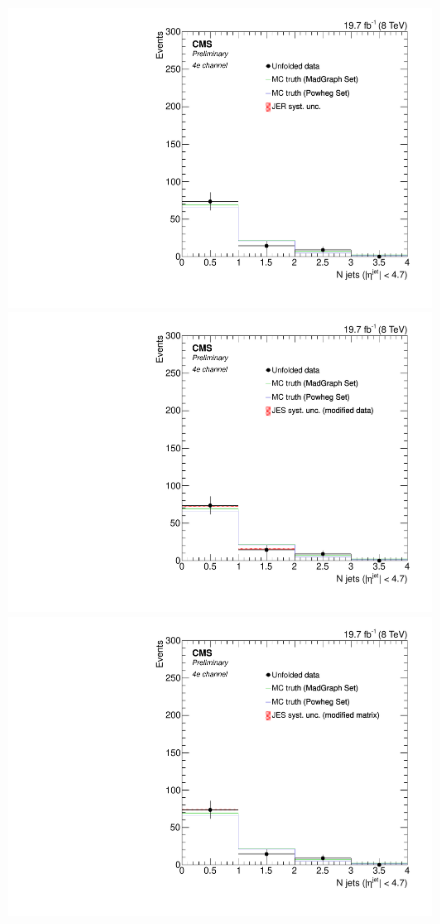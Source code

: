 \begin{figure}[hbtp]
\begin{center}
     \includegraphics[width=0.8\cmsFigWidth]{Figures/Unfolding/Systematics/ZZTo4e_Jets_JER_Mad_fr}
    \includegraphics[width=0.8\cmsFigWidth]{Figures/Unfolding/Systematics/ZZTo4e_Jets_JES_ModData_Mad_fr}     
    \includegraphics[width=0.8\cmsFigWidth]{Figures/Unfolding/Systematics/ZZTo4e_Jets_JES_ModMat_Mad_fr}

\end{center}
\end{figure}
